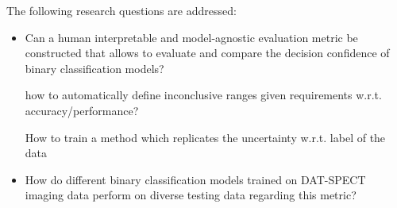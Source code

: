 The following research questions are addressed: 
\begin{itemize}
    \item Can a human interpretable and model-agnostic evaluation metric be constructed that allows 
    to evaluate and compare the decision confidence of binary classification models?

    how to automatically define inconclusive ranges given requirements w.r.t. accuracy/performance?

    How to train a method which replicates the uncertainty w.r.t. label of the data

    \item How do different binary classification models trained on DAT-SPECT imaging data perform on 
    diverse testing data regarding this metric? 

\end{itemize}




